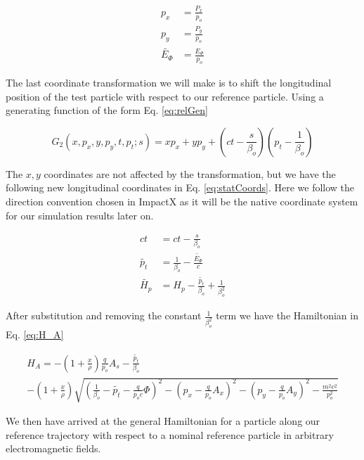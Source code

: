 \begin{equation} \label{eq:pOverP}
\begin{split}
	p_x &= \frac{P_x}{p_o}\\
	p_y &= \frac{P_y}{p_o}\\
	\tilde{E_{\Phi}} &= \frac{E_{\Phi}}{p_o}
\end{split}
\end{equation}

The last coordinate transformation we will make is to shift the longitudinal position of the test particle with respect to our reference particle. Using a generating function of the form Eq. \ref{eq:relGen}


\begin{equation} \label{eq:relGen}
	G_2(x,p_x,y,p_y,t,p_t;s) = x p_x  + y p_y + \left(ct - \frac{s}{\beta_o}\right)\left(p_t - \frac{1}{\beta_o}\right)
\end{equation}

The $x,y$ coordinates are not affected by the transformation, but we have the following new longitudinal coordinates in Eq. \ref{eq:statCoords}. Here we follow the direction convention chosen in ImpactX as it will be the native coordinate system for our simulation results later on.

\begin{equation} \label{eq:statCoords}
\begin{split}
	ct &= ct - \frac{s}{\beta_o}\\
	\tilde{p_t} &= \frac{1}{\beta_o} - \frac{\tilde{E_{\Phi}}}{c}\\
	\tilde{H_p} &= H_p - \frac{\tilde{p_t}}{\beta_o} + \frac{1}{\beta_o^2}
\end{split}
\end{equation}

After substitution and removing the constant $\frac{1}{\beta_o^2}$ term we have the Hamiltonian in Eq. \ref{eq:H_A}

\begin{multline} \label{eq:H_A}
	H_A = - \left(1 + \frac{x}{\rho}\right)\frac{q}{p_o}A_s - \frac{\tilde{p_t}}{\beta_o}\\
	-\left(1 + \frac{x}{\rho}\right)\sqrt{\left(\frac{1}{\beta_o} - \tilde{p_t}  - \frac{q}{p_o c}\Phi\right)^2 - \left(p_x -\frac{q}{p_o} A_x\right)^2 - \left(p_y - \frac{q}{p_o} A_y\right)^2 - \frac{m^2c^2}{p_o^2}}
\end{multline}

We then have arrived at the general Hamiltonian for a particle along our reference trajectory with respect to a nominal reference particle in arbitrary electromagnetic fields. 

